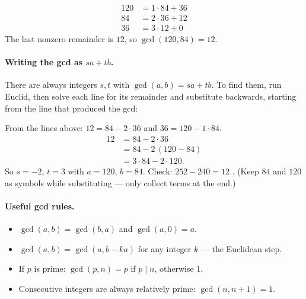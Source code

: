 \documentclass{fkt-notes}
\theoremstyle{definition}
\begin{document}
\begin{example}[$\gcd(120, 84)$]
  \begin{align*}
    120 & = 1 \cdot 84 + 36 \\
    84  & = 2 \cdot 36 + 12 \\
    36  & = 3 \cdot 12 + 0
  \end{align*}
  The last nonzero remainder is $12$, so $\gcd(120, 84) = 12$.
\end{example}

\paragraph{Writing the gcd as $sa + tb$.} There are always integers $s, t$
with $\gcd(a, b) = sa + tb$. To find them, run Euclid, then solve each
line for its remainder and substitute backwards, starting from the line
that produced the gcd:

\begin{example}[continued]
  From the lines above: $12 = 84 - 2 \cdot 36$ and $36 = 120 - 1 \cdot 84$.
  \begin{align*}
    12 & = 84 - 2 \cdot 36           \\
       & = 84 - 2\,(120 - 84)        \\
       & = 3 \cdot 84 - 2 \cdot 120.
  \end{align*}
  So $s = -2$, $t = 3$ with $a = 120$, $b = 84$. Check:
  $252 - 240 = 12$ \checkmark. (Keep $84$ and $120$ as symbols while
  substituting --- only collect terms at the end.)
\end{example}

\begin{rulepar}
  \paragraph{Useful gcd rules.}
  \begin{itemize}[nosep]
    \item $\gcd(a, b) = \gcd(b, a)$ and $\gcd(a, 0) = a$.
    \item $\gcd(a, b) = \gcd(a, b - ka)$ for any integer $k$ --- the
          Euclidean step.
    \item If $p$ is prime: $\gcd(p, n) = p$ if $p \mid n$, otherwise $1$.
    \item Consecutive integers are always relatively prime:
          $\gcd(n, n+1) = 1$.
  \end{itemize}
\end{rulepar}
\end{document}
